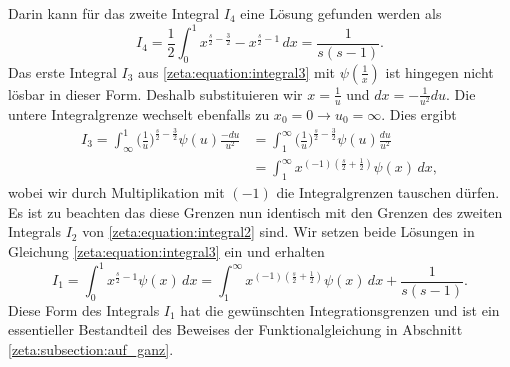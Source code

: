 Darin kann für das zweite Integral $I_4$ eine Lösung gefunden werden als
\begin{equation}
    I_4
    =
    \frac{1}{2}
    \int_0^1
    x^{\frac{s}{2}-\frac{3}{2}}
    -
    x^{\frac{s}{2}-1}
    \,dx
    =
    \frac{1}{s(s-1)}.
\end{equation}
Das erste Integral $I_3$ aus \eqref{zeta:equation:integral3} mit
$\psi (\frac{1}{x})$ ist hingegen nicht lösbar in dieser Form.
Deshalb substituieren wir $x = \frac{1}{u}$ und $dx = -\frac{1}{u^2}du$.
Die untere Integralgrenze wechselt ebenfalls zu $x_0 = 0 \rightarrow u_0 = \infty$.
Dies ergibt
\begin{align}
    I_3
    =
    \int_{\infty}^{1}
    \bigl(
    \frac{1}{u}
    \bigr)^{\frac{s}{2}-\frac{3}{2}}
    \psi(u)
    \frac{-du}{u^2}
    &=
    \int_{1}^{\infty}
    \biggl(
    \frac{1}{u}
    \biggr)^{\frac{s}{2}-\frac{3}{2}}
    \psi(u)
    \frac{du}{u^2}
    \\
    &=
    \int_{1}^{\infty}
    x^{(-1) (\frac{s}{2}+\frac{1}{2})}
    \psi(x)
    \,dx,
\end{align}
wobei wir durch Multiplikation mit $(-1)$ die Integralgrenzen tauschen dürfen.
Es ist zu beachten das diese Grenzen nun identisch mit den Grenzen des zweiten Integrals $I_2$ von \eqref{zeta:equation:integral2} sind.
Wir setzen beide Lösungen in Gleichung \eqref{zeta:equation:integral3} ein und erhalten
\begin{equation}
    I_1
    =
    \int_0^{1}
    x^{\frac{s}{2}-1}
    \psi(x)
    \,dx
    =
    \int_{1}^{\infty}
    x^{(-1) (\frac{s}{2}+\frac{1}{2})}
    \psi(x)
    \,dx
    +
    \frac{1}{s(s-1)}. \label{zeta:equation:intcal_res}
\end{equation}
Diese Form des Integrals $I_1$ hat die gewünschten Integrationsgrenzen
und ist ein essentieller Bestandteil des Beweises der Funktionalgleichung
in Abschnitt \ref{zeta:subsection:auf_ganz}.
